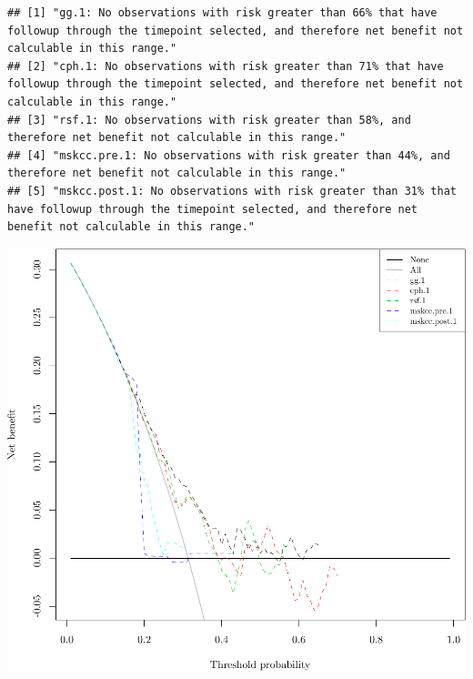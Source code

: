 \documentclass{article}\usepackage[]{graphicx}\usepackage[]{color}
\makeatletter
\def\maxwidth{ %
  \ifdim\Gin@nat@width>\linewidth
    \linewidth
  \else
    \Gin@nat@width
  \fi
}
\newenvironment{kframe}{%
 \def\at@end@of@kframe{}%
 \ifinner\ifhmode%
  \def\at@end@of@kframe{\end{minipage}}%
  \begin{minipage}{\columnwidth}%
 \fi\fi%
 \def\FrameCommand##1{\hskip\@totalleftmargin \hskip-\fboxsep
 \colorbox{shadecolor}{##1}\hskip-\fboxsep
     \hskip-\linewidth \hskip-\@totalleftmargin \hskip\columnwidth}%
 \MakeFramed {\advance\hsize-\width
   \@totalleftmargin\z@ \linewidth\hsize
   \@setminipage}}%
 {\par\unskip\endMakeFramed%
 \at@end@of@kframe}
\newenvironment{knitrout}{}{} %
\makeatother
\begin{document}
\begin{knitrout}
\begin{kframe}
\begin{alltt}
\end{alltt}
\begin{verbatim}
## [1] "gg.1: No observations with risk greater than 66% that have followup through the timepoint selected, and therefore net benefit not calculable in this range."        
## [2] "cph.1: No observations with risk greater than 71% that have followup through the timepoint selected, and therefore net benefit not calculable in this range."       
## [3] "rsf.1: No observations with risk greater than 58%, and therefore net benefit not calculable in this range."                                                         
## [4] "mskcc.pre.1: No observations with risk greater than 44%, and therefore net benefit not calculable in this range."                                                   
## [5] "mskcc.post.1: No observations with risk greater than 31% that have followup through the timepoint selected, and therefore net benefit not calculable in this range."
\end{verbatim}
\end{kframe}

{\centering \includegraphics[width=\maxwidth]{figure/05-model-selection-dca-1} 

}



\end{knitrout}
\end{document}
